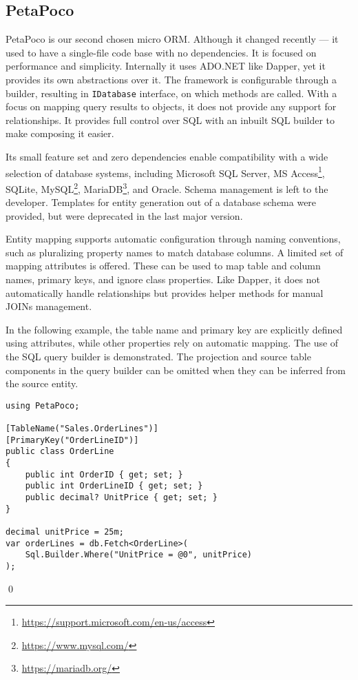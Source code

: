 \subsection{PetaPoco}\label{sec:feat_petapoco}

PetaPoco\cite{PetaPoco} is our second chosen micro ORM. Although it changed recently --- it used to have a single-file code base with no dependencies. It is focused on performance and simplicity. Internally it uses ADO.NET like Dapper, yet it provides its own abstractions over it. The framework is configurable through a builder, resulting in \texttt{IDatabase} interface, on which methods are called. With a focus on mapping query results to objects, it does not provide any support for relationships. It provides full control over SQL with an inbuilt SQL builder to make composing it easier. 

Its small feature set and zero dependencies enable compatibility with a wide selection of database systems, including Microsoft SQL Server, MS Access\footnote{\url{https://support.microsoft.com/en-us/access}}, SQLite, MySQL\footnote{\url{https://www.mysql.com/}}, MariaDB\footnote{\url{https://mariadb.org/}}, and Oracle. Schema management is left to the developer. Templates for entity generation out of a database schema were provided, but were deprecated in the last major version.

Entity mapping supports automatic configuration through naming conventions, such as pluralizing property names to match database columns. A limited set of mapping attributes is offered. These can be used to map table and column names, primary keys, and ignore class properties. Like Dapper, it does not automatically handle relationships but provides helper methods for manual JOINs management.

\begin{example}
\small
In the following example, the table name and primary key are explicitly defined using attributes, while other properties rely on automatic mapping. The use of the SQL query builder is demonstrated. The projection and source table components in the query builder can be omitted when they can be inferred from the source entity.

\begin{lstlisting}[language=CSharp]
using PetaPoco;

[TableName("Sales.OrderLines")]
[PrimaryKey("OrderLineID")]
public class OrderLine
{
    public int OrderID { get; set; }
    public int OrderLineID { get; set; }
    public decimal? UnitPrice { get; set; }
}

decimal unitPrice = 25m;
var orderLines = db.Fetch<OrderLine>(
    Sql.Builder.Where("UnitPrice = @0", unitPrice)
);
\end{lstlisting}
\qed
\end{example}

